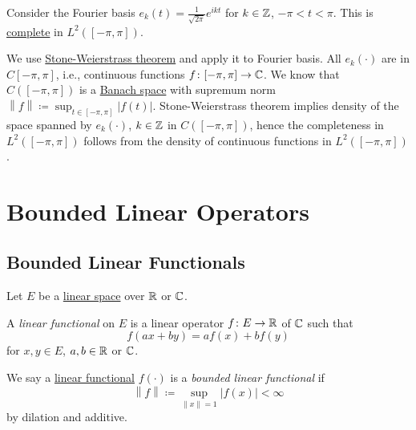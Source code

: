 \begin{eg}
	Consider the Fourier basis \(e_k (t) = \frac{1}{\sqrt{2\pi }} e^{ikt}\) for \(k\in \mathbb{\MakeUppercase{z}} \), \(-\pi < t < \pi \). This is \hyperref[def:complete-system]{complete} in \(L^2([-\pi , \pi ])\).
\end{eg}
\begin{explanation}
	We use \href{https://en.wikipedia.org/wiki/Stone%E2%80%93Weierstrass_theorem}{Stone-Weierstrass theorem} and apply it to Fourier basis. All \(e_k(\cdot)\) are in \(C[-\pi , \pi ]\), i.e., continuous functions \(f\colon [-\pi , \pi ]\to \mathbb{\MakeUppercase{c}} \). We know that \(C([-\pi , \pi ])\) is a \hyperref[def:Banach-space]{Banach space} with supremum norm \(\left\lVert f\right\rVert \coloneqq \sup _{t\in [-\pi, \pi ]}\left\vert f(t) \right\vert\). Stone-Weierstrass theorem implies density of the space spanned by \(e_k(\cdot)\), \(k\in \mathbb{\MakeUppercase{z}} \) in \(C([-\pi , \pi ])\), hence the completeness in \(L^2([-\pi , \pi ])\) follows from the density of continuous functions in \(L^2([-\pi , \pi ])\). 
\end{explanation}

\chapter{Bounded Linear Operators}
\section{Bounded Linear Functionals}

\begin{definition*}
	Let \(E\) be a \hyperref[def:linear-vector-space]{linear space} over \(\mathbb{\MakeUppercase{r}} \) or \(\mathbb{\MakeUppercase{c}} \).
	\begin{definition}\label{def:linear-functional}
		A \emph{linear functional} on \(E\) is a linear operator \(f\colon E\to \mathbb{\MakeUppercase{r}} \) of \(\mathbb{\MakeUppercase{c}} \) such that
		\[
			f(ax + by) = af(x) + bf(y)
		\]
		for \(x, y\in E\), \(a, b\in \mathbb{\MakeUppercase{r}} \) or \(\mathbb{\MakeUppercase{c}} \).
	\end{definition}
	\begin{definition}\label{def:bounded-linear-functional}
		We say a \hyperref[def:linear-functional]{linear functional} \(f(\cdot)\) is a \emph{bounded linear functional} if
		\[
			\left\lVert f\right\rVert \coloneqq \sup _{\left\lVert x\right\rVert = 1}\left\vert f(x) \right\vert  < \infty
		\]
		by dilation and additive.
	\end{definition}
\end{definition*}

